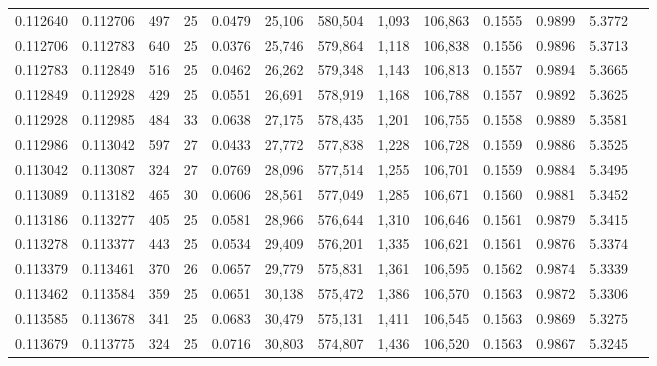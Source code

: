 \begin{tabular}{rrrrrrrrrrrrr}
0.112640 & 0.112706 & 497 &  25 &                                     0.0479 &  25,106 & 580,504 &   1,093 & 106,863 & 0.1555 & 0.9899 & 5.3772 \\
0.112706 & 0.112783 & 640 &  25 &                                     0.0376 &  25,746 & 579,864 &   1,118 & 106,838 & 0.1556 & 0.9896 & 5.3713 \\
0.112783 & 0.112849 & 516 &  25 &                                     0.0462 &  26,262 & 579,348 &   1,143 & 106,813 & 0.1557 & 0.9894 & 5.3665 \\
0.112849 & 0.112928 & 429 &  25 &                                     0.0551 &  26,691 & 578,919 &   1,168 & 106,788 & 0.1557 & 0.9892 & 5.3625 \\
0.112928 & 0.112985 & 484 &  33 &                                     0.0638 &  27,175 & 578,435 &   1,201 & 106,755 & 0.1558 & 0.9889 & 5.3581 \\
0.112986 & 0.113042 & 597 &  27 &                                     0.0433 &  27,772 & 577,838 &   1,228 & 106,728 & 0.1559 & 0.9886 & 5.3525 \\
0.113042 & 0.113087 & 324 &  27 &                                     0.0769 &  28,096 & 577,514 &   1,255 & 106,701 & 0.1559 & 0.9884 & 5.3495 \\
0.113089 & 0.113182 & 465 &  30 &                                     0.0606 &  28,561 & 577,049 &   1,285 & 106,671 & 0.1560 & 0.9881 & 5.3452 \\
0.113186 & 0.113277 & 405 &  25 &                                     0.0581 &  28,966 & 576,644 &   1,310 & 106,646 & 0.1561 & 0.9879 & 5.3415 \\
0.113278 & 0.113377 & 443 &  25 &                                     0.0534 &  29,409 & 576,201 &   1,335 & 106,621 & 0.1561 & 0.9876 & 5.3374 \\
0.113379 & 0.113461 & 370 &  26 &                                     0.0657 &  29,779 & 575,831 &   1,361 & 106,595 & 0.1562 & 0.9874 & 5.3339 \\
0.113462 & 0.113584 & 359 &  25 &                                     0.0651 &  30,138 & 575,472 &   1,386 & 106,570 & 0.1563 & 0.9872 & 5.3306 \\
0.113585 & 0.113678 & 341 &  25 &                                     0.0683 &  30,479 & 575,131 &   1,411 & 106,545 & 0.1563 & 0.9869 & 5.3275 \\
0.113679 & 0.113775 & 324 &  25 &                                     0.0716 &  30,803 & 574,807 &   1,436 & 106,520 & 0.1563 & 0.9867 & 5.3245 \\

\end{tabular}
